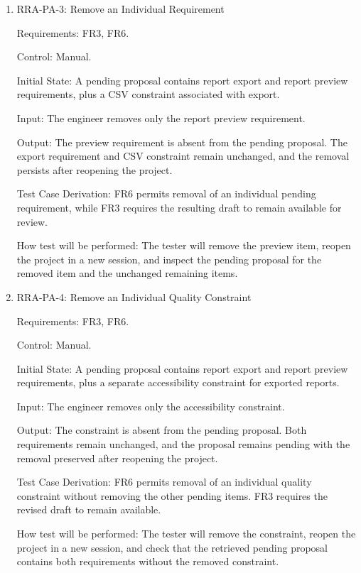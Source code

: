 \documentclass[12pt, titlepage]{article}
\begin{document}
\begin{enumerate}
\item{RRA-PA-3: Remove an Individual Requirement\\}

Requirements: FR3, FR6.

Control: Manual.

Initial State: A pending proposal contains report export and report preview
requirements, plus a CSV constraint associated with export.

Input: The engineer removes only the report preview requirement.

Output: The preview requirement is absent from the pending proposal. The
export requirement and CSV constraint remain unchanged, and the removal
persists after reopening the project.

Test Case Derivation: FR6 permits removal of an individual pending
requirement, while FR3 requires the resulting draft to remain available for
review.

How test will be performed: The tester will remove the preview item, reopen
the project in a new session, and inspect the pending proposal for the removed
item and the unchanged remaining items.

\item{RRA-PA-4: Remove an Individual Quality Constraint\\}

Requirements: FR3, FR6.

Control: Manual.

Initial State: A pending proposal contains report export and report preview
requirements, plus a separate accessibility constraint for exported reports.

Input: The engineer removes only the accessibility constraint.

Output: The constraint is absent from the pending proposal. Both requirements
remain unchanged, and the proposal remains pending with the removal preserved
after reopening the project.

Test Case Derivation: FR6 permits removal of an individual quality constraint
without removing the other pending items. FR3 requires the revised draft to
remain available.

How test will be performed: The tester will remove the constraint, reopen the
project in a new session, and check that the retrieved pending proposal
contains both requirements without the removed constraint.

\end{enumerate}
\end{document}
